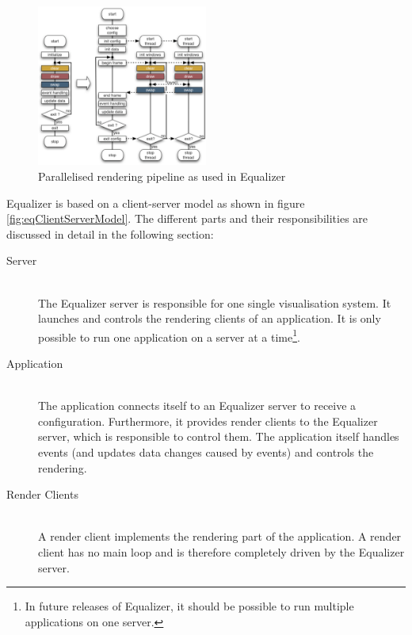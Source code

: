 \begin{figure}[H]
	\centering
	\includegraphics[width=0.5\textwidth]{../figures/parallel_rendering_execution_flow}
	\caption{Parallelised rendering pipeline as used in Equalizer\cite{website:equalizer}}
	\label{fig:eqParallelisation}
\end{figure}

Equalizer is based on a client-server model as shown in figure \ref{fig:eqClientServerModel}. The different parts and their responsibilities are discussed in detail in the following section:
\begin{description}
	\item[Server] \hfill\\The Equalizer server is responsible for one single visualisation system. It launches and controls the rendering clients of an application. It is only possible to run one application on a server at a time\footnote{In future releases of Equalizer, it should be possible to run multiple applications on one server.}.
	\item[Application] \hfill\\The application connects itself to an Equalizer server to receive a configuration. Furthermore, it provides render clients to the Equalizer server, which is responsible to control them. The application itself handles events (and updates data changes caused by events) and controls the rendering.
	\item[Render Clients] \hfill\\A render client implements the rendering part of the application. A render client has no main loop and is therefore completely driven by the Equalizer server. 
\end{description}


